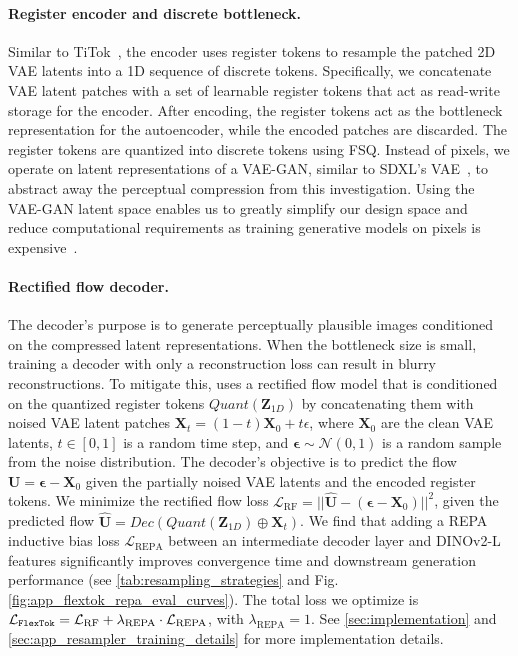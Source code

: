 \paragraph{Register encoder and discrete bottleneck.} Similar to TiTok~\cite{yu2024titok}, the encoder uses register tokens to resample the patched 2D VAE latents into a 1D sequence of discrete tokens. Specifically, we concatenate VAE latent patches with a set of learnable register tokens that act as read-write storage for the encoder. After encoding, the register tokens act as the bottleneck representation for the autoencoder, while the encoded patches are discarded. The register tokens are quantized into discrete tokens using FSQ. Instead of pixels, we operate on latent representations of a VAE-GAN, similar to SDXL's VAE~\cite{Podell2023SDXL}, to abstract away the perceptual compression from this investigation. Using the VAE-GAN latent space enables us to greatly simplify our design space and reduce computational requirements as training generative models on pixels is expensive~\cite{rombach2022high}.

\paragraph{Rectified flow decoder.}\label{sec:rf_decoder}
The decoder's purpose is to generate perceptually plausible images conditioned on the compressed latent representations. When the bottleneck size is small, training a decoder with only a reconstruction loss can result in blurry reconstructions. To mitigate this, \ours uses a rectified flow model that is conditioned on the quantized register tokens $Quant(\bm{Z}_{1D})$ by concatenating them with noised VAE latent patches $\bm{X}_t = (1-t) \bm{X}_0 + t \epsilon$, where $\bm{X}_0$ are the clean VAE latents, $t \in [0,1]$ is a random time step, and $\bm{\epsilon} \sim \mathcal{N}(0,1)$ is a random sample from the noise distribution. The decoder's objective is to predict the flow $\bm{U} = \bm{\epsilon} - \bm{X}_0$ given the partially noised VAE latents and the encoded register tokens. We minimize the rectified flow loss $\mathcal{L}_\text{RF} = || \bm{\hat{U}} - (\bm{\epsilon} - \bm{X}_0) ||^2$, given the predicted flow $\bm{\hat{U}} = Dec(Quant(\bm{Z}_{1D}) \oplus \bm{X}_t)$. We find that adding a REPA~\cite{Yu2024REPA} inductive bias loss $\mathcal{L}_\text{REPA}$ between an intermediate decoder layer and DINOv2-L~\cite{Oquab2023DINOv2} features significantly improves convergence time and downstream generation performance (see \cref{tab:resampling_strategies} and Fig.\ref{fig:app_flextok_repa_eval_curves}). The total \ours loss we optimize is $\mathcal{L}_\texttt{FlexTok} = \mathcal{L}_\text{RF} + \lambda_\text{REPA} \cdot \mathcal{L}_\text{REPA}$, with $\lambda_\text{REPA} = 1$. See \cref{sec:implementation} and \cref{sec:app_resampler_training_details} for more implementation details.


